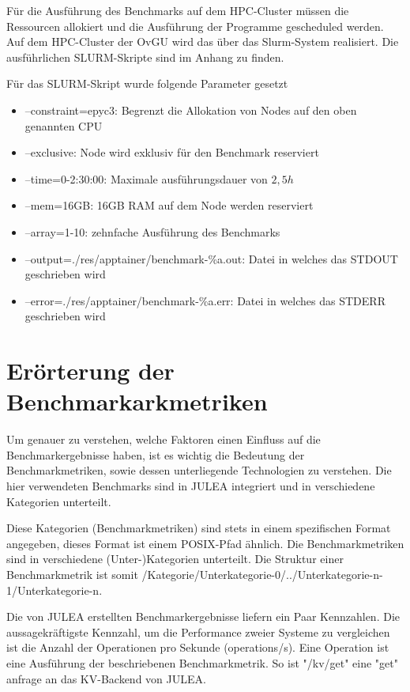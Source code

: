 Für die Ausführung des Benchmarks auf dem HPC-Cluster müssen die Ressourcen allokiert und die Ausführung der Programme gescheduled werden. Auf dem HPC-Cluster der OvGU wird das über das Slurm-System realisiert. Die ausführlichen SLURM-Skripte sind im Anhang zu finden. 

Für das SLURM-Skript wurde folgende Parameter gesetzt

\begin{itemize}
    \item --constraint=epyc3: Begrenzt die Allokation von Nodes auf den oben genannten CPU
    \item --exclusive: Node wird exklusiv für den Benchmark reserviert
    \item --time=0-2:30:00: Maximale ausführungsdauer von $2,5h$
    \item --mem=16GB: 16GB RAM auf dem Node werden reserviert
    \item --array=1-10: zehnfache Ausführung des Benchmarks
    \item --output=./res/apptainer/benchmark-\%a.out: Datei in welches das STDOUT geschrieben wird
    \item --error=./res/apptainer/benchmark-\%a.err: Datei in welches das STDERR geschrieben wird 
\end{itemize}

\section{Erörterung der Benchmarkarkmetriken}

Um genauer zu verstehen, welche Faktoren einen Einfluss auf die Benchmarkergebnisse haben, ist es wichtig die Bedeutung der Benchmarkmetriken, sowie dessen unterliegende Technologien zu verstehen. 
Die hier verwendeten Benchmarks sind in JULEA integriert und in verschiedene Kategorien unterteilt.

Diese Kategorien (Benchmarkmetriken) sind stets in einem spezifischen Format angegeben, dieses Format ist einem POSIX-Pfad ähnlich. Die Benchmarkmetriken sind in verschiedene (Unter-)Kategorien unterteilt. Die Struktur einer Benchmarkmetrik ist somit /Kategorie/Unterkategorie-0/../Unterkategorie-n-1/Unterkategorie-n.

Die von JULEA erstellten Benchmarkergebnisse liefern ein Paar Kennzahlen. Die aussagekräftigste Kennzahl, um die Performance zweier Systeme zu vergleichen ist die Anzahl der Operationen pro Sekunde (operations/s). Eine Operation ist eine Ausführung der beschriebenen Benchmarkmetrik. So ist "/kv/get" eine "get" anfrage an das KV-Backend von JULEA. 

